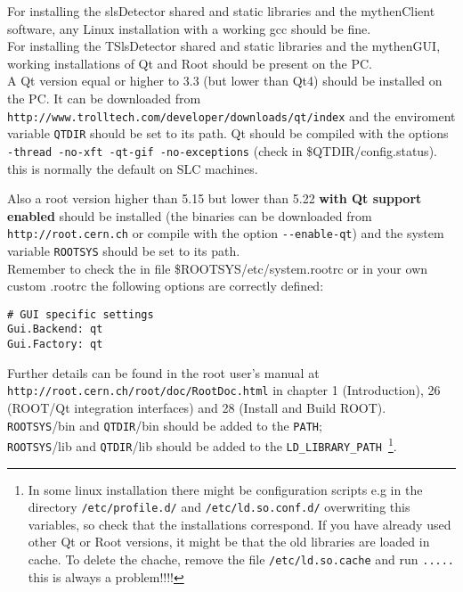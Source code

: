\documentclass{report}
\begin{document}
For installing the slsDetector shared and static libraries and the mythenClient software, any Linux installation with a working gcc should be fine.\\

For installing the TSlsDetector shared and static libraries and the mythenGUI, working installations of Qt and Root should be present on the PC.\\

A Qt version equal or higher to 3.3 (but lower than Qt4) should be installed on the PC. It can be downloaded from \\
\verb|http://www.trolltech.com/developer/downloads/qt/index| and the enviroment variable  \verb|QTDIR| should be set to its path.
Qt should be compiled with the options \verb|-thread -no-xft -qt-gif -no-exceptions| (check in \textsf{\$QTDIR/config.status}). this is normally the default on SLC machines.


Also a \textsf{root} version higher than 5.15 but lower than 5.22 \textbf{with Qt support enabled} should be installed (the binaries can be downloaded from \verb|http://root.cern.ch| or compile with the option \verb|--enable-qt|) and the system variable \verb|ROOTSYS| should be set to its path. \\
Remember to check the in file \$ROOTSYS/etc/system.rootrc or in your own custom .rootrc the following options are correctly defined:
\begin{verbatim}
# GUI specific settings
Gui.Backend: qt
Gui.Factory: qt
\end{verbatim}
Further details can be found in the root user's manual at \verb|http://root.cern.ch/root/doc/RootDoc.html| in chapter 1 (Introduction), 26 (ROOT/Qt integration interfaces) and 28 (Install and Build ROOT).\\

\verb|ROOTSYS|/bin and \verb|QTDIR|/bin should be added to the \verb|PATH|;\\
\verb|ROOTSYS|/lib and \verb|QTDIR|/lib should be added to the \verb|LD_LIBRARY_PATH|~\footnote{In some linux installation there might be configuration scripts e.g in the directory \texttt{/etc/profile.d/} and \texttt{/etc/ld.so.conf.d/} overwriting this variables, so check that the installations correspond. If you have already used other Qt or Root versions, it might be that the old libraries are loaded in cache. To delete the chache, remove the file \texttt{/etc/ld.so.cache} and run \texttt{.....} this is always a problem!!!!}.\\
\end{document}
